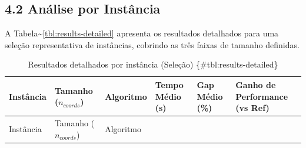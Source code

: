 \subsection{4.2 Análise por
Instância}\label{sec-42-analise-por-instancia}

A Tabela\textasciitilde{}\ref{tbl:results-detailed} apresenta os
resultados detalhados para uma seleção representativa de instâncias,
cobrindo as três faixas de tamanho definidas.

\begin{longtable}[]{@{}
  >{\raggedright\arraybackslash}p{}
  >{\centering\arraybackslash}p{}
  >{\raggedright\arraybackslash}p{}
  >{\centering\arraybackslash}p{}
  >{\centering\arraybackslash}p{}
  >{\centering\arraybackslash}p{}@{}}
\caption{Resultados detalhados por instância (Seleção)
\{\#tbl:results-detailed\}}\tabularnewline
\toprule\noalign{}
\begin{minipage}[b]{\linewidth}\raggedright
Instância
\end{minipage} & \begin{minipage}[b]{\linewidth}\centering
Tamanho (\(n_{coords}\))
\end{minipage} & \begin{minipage}[b]{\linewidth}\raggedright
Algoritmo
\end{minipage} & \begin{minipage}[b]{\linewidth}\centering
Tempo Médio (s)
\end{minipage} & \begin{minipage}[b]{\linewidth}\centering
Gap Médio (\%)
\end{minipage} & \begin{minipage}[b]{\linewidth}\centering
Ganho de Performance (vs Ref)
\end{minipage} \\
\midrule\noalign{}
\endfirsthead
\toprule\noalign{}
\begin{minipage}[b]{\linewidth}\raggedright
Instância
\end{minipage} & \begin{minipage}[b]{\linewidth}\centering
Tamanho (\(n_{coords}\))
\end{minipage} & \begin{minipage}[b]{\linewidth}\raggedright
Algoritmo
\end{minipage} & \begin{minipage}[b]{\linewidth}\centering

\end{minipage}
\end{longtable}
